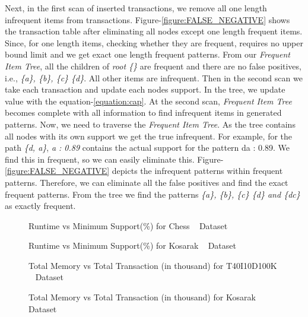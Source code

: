 \documentclass[conference]{IEEEtran}
\begin{document}
Next, in the first scan of inserted transactions, we remove all one length infrequent items from transactions. Figure-\ref{figure:FALSE_NEGATIVE} shows the transaction table after eliminating all nodes except one length frequent items. Since, for one length items, checking whether they are frequent, requires no upper bound limit and we get exact one length frequent patterns. From our \emph{Frequent Item Tree}, all the children of \emph{root \{\}} are frequent and there are no false positives, i.e., \emph{\{a\}, \{b\}, \{c\} \{d\}}. All other items are infrequent. Then in the second scan we take each transaction and update each nodes support. In the tree, we update value with the equation-\ref{equation:cap}. At the second scan, \emph{Frequent Item Tree} becomes complete with all information to find infrequent items in generated patterns. Now, we need to traverse the \emph{Frequent Item Tree}. As the tree contains all nodes with its own support we get the true infrequent. For example, for the path \emph{\{d, a\}}, \emph{a : 0.89} contains the actual support for the pattern {da : 0.89}. We find this in frequent, so we can easily eliminate this. Figure-\ref{figure:FALSE_NEGATIVE} depicts the infrequent patterns within frequent patterns. Therefore, we can eliminate all the false positives and find the exact frequent patterns. From the tree we find the patterns \emph{\{a\}, \{b\}, \{c\} \{d\} and \{dc\}} as exactly frequent.

%    
\begin{figure}[t]
\begin{minipage}{0.5\linewidth}
    \centering
    
    \caption{Runtime vs Minimum Support(\%) for Chess ~\cite{dataset} Dataset }
    \label{result:g_chess_total}
\end{minipage}%
\begin{minipage}{0.5\linewidth}
   \centering
   
   \caption{Runtime vs Minimum Support(\%) for Kosarak ~\cite{dataset} Dataset }
   \label{result:g_k_total}
    \end{minipage}
\end{figure} 	

\begin{figure}[t]
\begin{minipage}{0.5\linewidth}
    \centering
    
    \caption{Total Memory vs Total Transaction (in thousand) for T40I10D100K ~\cite{dataset} Dataset }
    \label{result:g_t10_memory_node}
\end{minipage}%
\begin{minipage}{0.5\linewidth}
   \centering
   
   \caption{Total Memory vs Total Transaction (in thousand) for Kosarak ~\cite{dataset} Dataset }
   \label{result:g_k_memory_node}
    \end{minipage}
\end{figure}
\end{document}
